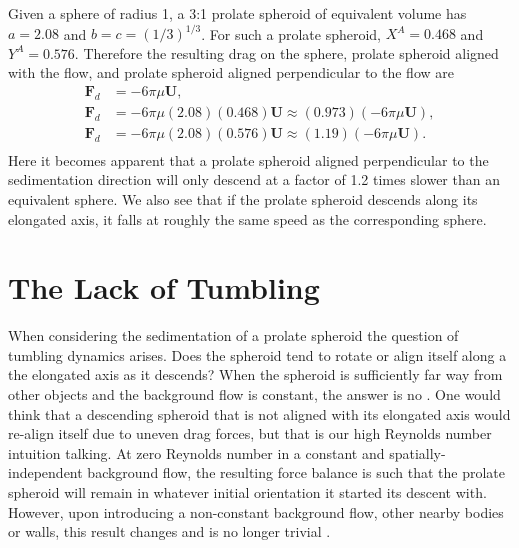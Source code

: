 \documentclass{article}
\def\U{\mathbf{U}}
\def\F{\mathbf{F}}
\begin{document}
Given a sphere of radius 1, a 3:1 prolate spheroid of equivalent volume has $a = 2.08$ and $b = c = (1/3)^{1/3}$.
For such a prolate spheroid, $X^A = 0.468$ and $Y^A= 0.576$. Therefore the resulting drag on the sphere, prolate spheroid
aligned with the flow, and prolate spheroid aligned perpendicular to the flow are 
\begin{equation}
\begin{split}
    \F_{d} &= - 6\pi\mu \U, \\
    \F_{d} &= - 6\pi\mu (2.08)(0.468)\U \approx (0.973)(- 6\pi\mu \U), \\
    \F_{d} &= - 6\pi\mu (2.08)(0.576)\U \approx (1.19)(- 6\pi\mu \U).\\
\end{split}
\end{equation}
Here it becomes apparent that a prolate spheroid aligned perpendicular to the sedimentation direction will only descend at a factor of 1.2 times 
slower than an equivalent sphere. We also see that if the prolate spheroid descends along its elongated axis, it falls 
at roughly the same speed as the corresponding sphere. 


\section{The Lack of Tumbling}
When considering the sedimentation of a prolate spheroid the question of tumbling dynamics 
arises. Does the spheroid tend to rotate or align itself along a the elongated
axis as it descends? When the spheroid is sufficiently far way from other objects and the 
background flow is constant, the answer is no \cite{Graham}. One would think that a 
descending spheroid
that is not aligned with its elongated axis would re-align itself due to uneven drag forces,
but that is our high Reynolds number intuition talking. At zero Reynolds number in a 
constant and spatially-independent background flow, the resulting force balance is such that
the prolate spheroid will remain in whatever initial orientation it started its descent
with. However, upon introducing a non-constant background flow, other nearby bodies or walls, 
this result changes and is no longer trivial \cite{Spagnolie}.
\end{document}
